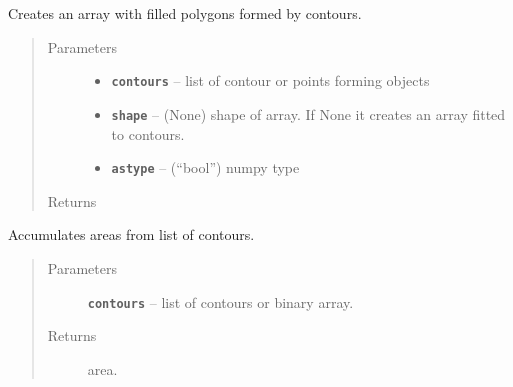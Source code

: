 \documentclass[letterpaper,10pt,english]{sphinxmanual}
\begin{document}

\begin{fulllineitems}
\label{RRtoolbox.lib.arrayops:RRtoolbox.lib.arrayops.basic.contours2mask}
Creates an array with filled polygons formed by contours.
\begin{quote}\begin{description}
\item[{Parameters}] \leavevmode\begin{itemize}
\item {} 
\textbf{\texttt{contours}} -- list of contour or points forming objects

\item {} 
\textbf{\texttt{shape}} -- (None) shape of array. If None it creates an array fitted to contours.

\item {} 
\textbf{\texttt{astype}} -- (``bool'') numpy type

\end{itemize}

\item[{Returns}] \leavevmode


\end{description}\end{quote}

\end{fulllineitems}


\begin{fulllineitems}
\label{RRtoolbox.lib.arrayops:RRtoolbox.lib.arrayops.basic.contoursArea}
Accumulates areas from list of contours.
\begin{quote}\begin{description}
\item[{Parameters}] \leavevmode
\textbf{\texttt{contours}} -- list of contours or binary array.

\item[{Returns}] \leavevmode
area.

\end{description}\end{quote}

\end{fulllineitems}
\end{document}
